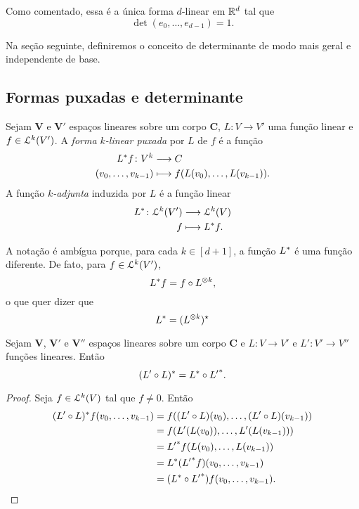 Como comentado, essa é a única forma $d$-linear em $\mathbb{R}^d$ tal que	\begin{equation*}
	\det(e_0,\ldots,e_{d-1})=1.
	\end{equation*}

Na seção seguinte, definiremos o conceito de determinante de modo mais geral e independente de base.

\subsection{Formas puxadas e determinante}

\begin{definition}
Sejam $\bm V$ e $\bm V'$ espaços lineares sobre um corpo $\bm C$, $L \colon V \to V'$ uma função linear e $f \in \mathcal{L}^k(V')$. A \emph{forma $k$-linear puxada} por $L$ de $f$ é a função
	\begin{align*}
	{L^*f}\colon {V^k} &\longrightarrow {C} \\{(v_0,\ldots,v_{k-1})} &\longmapsto f(L(v_0),\ldots,L(v_{k-1})).
	\end{align*}
A função \emph{$k$-adjunta} induzida por $L$ é a função linear
	\begin{align*}
	{L^*}\colon {\mathcal{L}^k(V')} &\longrightarrow {\mathcal{L}^k(V)} \\{f} &\longmapsto L^* f.
	\end{align*}
\end{definition}

A notação é ambígua porque, para cada $k \in [d+1]$, a função $L^*$ é uma função diferente. De fato, para $f \in \mathcal{L}^k(V')$,
	\begin{equation*}
	L^* f = f \circ L^{\otimes k},
	\end{equation*}
o que quer dizer que
	\begin{equation*}
	L ^* = (L^{\otimes k})^\star
	\end{equation*}

\begin{proposition}
Sejam $\bm V$, $\bm V'$ e $\bm V''$ espaços lineares sobre um corpo $\bm C$ e $L\colon V \to V'$ e $L'\colon V' \to V''$ funções lineares. Então
	\begin{equation*}
	(L' \circ L)^* = {L}^* \circ {L'}^*.
	\end{equation*}
\end{proposition}
\begin{proof} Seja $f \in \mathcal{L}^k(V)$ tal que $f \neq 0$. Então
	\begin{align*}
	(L' \circ L)^* f (v_0,\ldots,v_{k-1}) &= f((L' \circ L)(v_0),\ldots,(L' \circ L)(v_{k-1})) \\
		&= f(L'(L(v_0)),\ldots,L'(L(v_{k-1}))) \\
		&= {L'}^* f(L(v_0),\ldots,L(v_{k-1})) \\
		&= L^*({L'}^* f)(v_0,\ldots,v_{k-1}) \\
		&= (L^* \circ {L'}^*) f(v_0,\ldots,v_{k-1}).
	\end{align*}
\end{proof}



